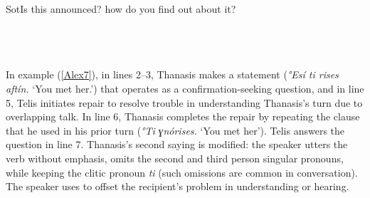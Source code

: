 \documentclass[output=paper]{LSP/langsci}
\begin{document}
\begin{Transcript}[FS {>}{>\hspace{0.1in}}]{Sot}{Is this announced? how do you find out about it?}%
\label{Alex6}%
\\
\\
 \\
  \\
\end{Transcript}

In example (\ref{Alex7}), in lines 2--3, Thanasis makes a statement (\textit{°Εsí ti \underline{}rises aftín.} `You met her.') that operates as a confirmation-seeking question, and in line 5, Telis initiates repair to resolve trouble in understanding Thanasis’s turn due to overlapping talk. In line 6, Thanasis completes the repair by repeating the clause that he used in his prior turn (\textit{°Τi ɣnórises.} `You met her'). Telis answers the question in line 7. Thanasis’s second saying is modified: the speaker utters the verb without emphasis, omits the second and third person singular pronouns, while keeping the clitic pronoun \textit{ti} (such omissions are common in  conversation). The speaker uses  to offset the recipient’s problem in understanding or hearing. 
\end{document}
